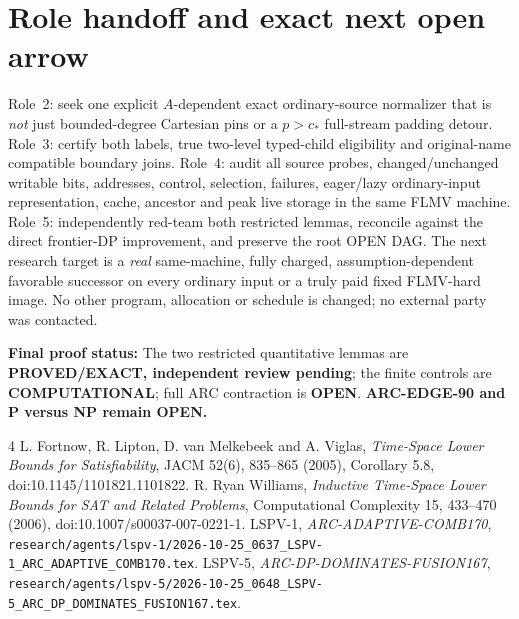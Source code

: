 \documentclass[11pt]{article}
\begin{document}
\section{Role handoff and exact next open arrow}
Role~2: seek one explicit $A$-dependent exact ordinary-source normalizer that is \emph{not} just bounded-degree Cartesian pins or a $p>c_*$ full-stream padding detour. Role~3: certify both labels, true two-level typed-child eligibility and original-name compatible boundary joins. Role~4: audit all source probes, changed/unchanged writable bits, addresses, control, selection, failures, eager/lazy ordinary-input representation, cache, ancestor and peak live storage in the same FLMV machine. Role~5: independently red-team both restricted lemmas, reconcile against the direct frontier-DP improvement, and preserve the root OPEN DAG. The next research target is a \emph{real} same-machine, fully charged, assumption-dependent favorable successor on every ordinary input or a truly paid fixed FLMV-hard image. No other program, allocation or schedule is changed; no external party was contacted.

\textbf{Final proof status:} The two restricted quantitative lemmas are \textbf{PROVED/EXACT, independent review pending}; the finite controls are \textbf{COMPUTATIONAL}; full ARC contraction is \textbf{OPEN}. \textbf{ARC-EDGE-90 and P versus NP remain OPEN.}

\begin{thebibliography}{4}
 L. Fortnow, R. Lipton, D. van Melkebeek and A. Viglas, \emph{Time-Space Lower Bounds for Satisfiability}, JACM 52(6), 835--865 (2005), Corollary 5.8, doi:10.1145/1101821.1101822.
 R. Ryan Williams, \emph{Inductive Time-Space Lower Bounds for SAT and Related Problems}, Computational Complexity 15, 433--470 (2006), doi:10.1007/s00037-007-0221-1.
 LSPV-1, \emph{ARC-ADAPTIVE-COMB170}, \texttt{research/agents/lspv-1/2026-10-25\_0637\_LSPV-1\_ARC\_ADAPTIVE\_COMB170.tex}.
 LSPV-5, \emph{ARC-DP-DOMINATES-FUSION167}, \texttt{research/agents/lspv-5/2026-10-25\_0648\_LSPV-5\_ARC\_DP\_DOMINATES\_FUSION167.tex}.
\end{thebibliography}
\end{document}
